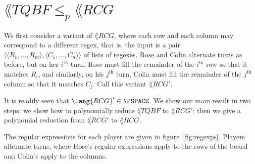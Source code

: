 \documentclass{article}
\newcommand{\0}{\mathbf{0}}
\newcommand{\1}{\mathbf{1}}
\newcommand{\2}{\mathbf{2}}
\newcommand{\TQBF}{\lang{TQBF}}
\newcommand{\RCG}{\lang{RCG}}
\newcommand{\tup}[1]{\langle{} #1 \rangle{}}
\newcommand{\reducp}[2]{{{#1} \le_p {#2}}}
\theoremstyle{plain}
\theoremstyle{definition}
\newcounter{row}
\newcounter{col}
\begin{document}
\section{\texorpdfstring{$\reducp{\TQBF}{\RCG}$}{TQBF <=p RCG}}

We first consider a variant of $\RCG$, where each row and each column may correspond to a different regex, that is, the input is a pair $\tup{\tup{R_1,\ldots,R_m},\tup{C_1,\ldots,C_n}}$ of lists of regexes. Rose and Colin alternate turns as before, but on her $i^\text{th}$ turn, Rose must fill the remainder of the $i^\text{th}$ row so that it matches $R_i$, and similarly, on his $j^\text{th}$ turn, Colin must fill the remainder of the $j^\text{th}$ column so that it matches $C_j$.  Call this variant $\RCG'$.

It is readily seen that $\RCG'\in\PSPACE$.  We show our main result in two steps: we show how to polynomially reduce $\TQBF$ to $\RCG'$; then we give a polynomial reduction from $\RCG'$ to $\RCG$.


The regular expressions for each player are given in
figure~\ref{fig:regexps}. Players alternate turns, where Rose's
regular expressions apply to the rows of the board and Colin's apply
to the columns.
\end{document}
